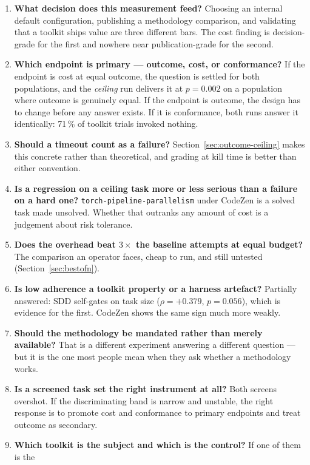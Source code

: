 \documentclass[11pt,a4paper]{article}
\newcommand{\task}[1]{\texttt{\footnotesize #1}}
\begin{document}
\begin{enumerate}
\item \textbf{What decision does this measurement feed?} Choosing an internal default
      configuration, publishing a methodology comparison, and validating that a toolkit ships
      value are three different bars. The cost finding is decision-grade for the first and
      nowhere near publication-grade for the second.
\item \textbf{Which endpoint is primary --- outcome, cost, or conformance?} If the endpoint is
      cost at equal outcome, the question is settled for both populations, and the
      \emph{ceiling} run delivers it at $p = 0.002$ on a population where outcome is genuinely
      equal. If the endpoint is outcome, the design has to change before any answer exists. If
      it is conformance, both runs answer it identically: 71\,\% of toolkit trials invoked
      nothing.
\item \textbf{Should a timeout count as a failure?} Section~\ref{sec:outcome-ceiling} makes
      this concrete rather than theoretical, and grading at kill time is better than either
      convention.
\item \textbf{Is a regression on a ceiling task more or less serious than a failure on a hard
      one?} \task{torch-pipeline-parallelism} under CodeZen is a solved task made unsolved.
      Whether that outranks any amount of cost is a judgement about risk tolerance.
\item \textbf{Does the overhead beat $3\times$ the baseline attempts at equal budget?} The
      comparison an operator faces, cheap to run, and still untested
      (Section~\ref{sec:bestofn}).
\item \textbf{Is low adherence a toolkit property or a harness artefact?} Partially answered:
      SDD self-gates on task size ($\rho = +0.379$, $p = 0.056$), which is evidence for the
      first. CodeZen shows the same sign much more weakly.
\item \textbf{Should the methodology be mandated rather than merely available?} That is a
      different experiment answering a different question --- but it is the one most people
      mean when they ask whether a methodology works.
\item \textbf{Is a screened task set the right instrument at all?} Both screens overshot. If
      the discriminating band is narrow and unstable, the right response is to promote cost
      and conformance to primary endpoints and treat outcome as secondary.
\item \textbf{Which toolkit is the subject and which is the control?} If one of them is the

\end{enumerate}
\end{document}
